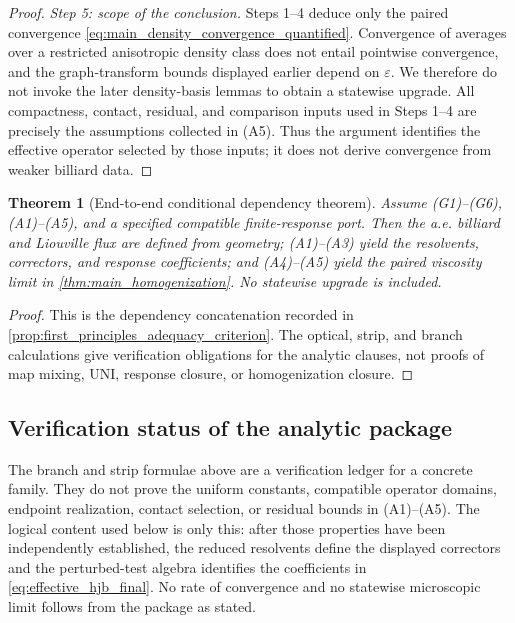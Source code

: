 \documentclass[12pt, letterpaper]{amsart}
\theoremstyle{plain}
\newtheorem{theorem}{Theorem}[section]
\theoremstyle{definition}
\theoremstyle{remark}
\begin{document}
\begin{proof}
\emph{Step 5: scope of the conclusion.}
Steps 1--4 deduce only the paired convergence
\eqref{eq:main_density_convergence_quantified}.  Convergence of averages over a
restricted anisotropic density class does not entail pointwise convergence, and
the graph-transform bounds displayed earlier depend on $\varepsilon$.  We
therefore do not invoke the later density-basis lemmas to obtain a statewise
upgrade.  All compactness, contact, residual, and comparison inputs used in
Steps 1--4 are precisely the assumptions collected in \textup{(A5)}.  Thus the
argument identifies the effective operator selected by those inputs; it does
not derive convergence from weaker billiard data.
\end{proof}




\begin{theorem}[End-to-end conditional dependency theorem]
\label{thm:end_to_end_deterministic_derivation}
Assume \textup{(G1)--(G6)}, \textup{(A1)--(A5)}, and a specified compatible
finite-response port. Then the a.e. billiard and Liouville flux are defined
from geometry; \textup{(A1)--(A3)} yield the resolvents, correctors, and
response coefficients; and \textup{(A4)--(A5)} yield the paired viscosity
limit in \cref{thm:main_homogenization}. No statewise upgrade is included.
\end{theorem}

\begin{proof}
This is the dependency concatenation recorded in
\cref{prop:first_principles_adequacy_criterion}. The optical, strip, and
branch calculations give verification obligations for the analytic clauses,
not proofs of map mixing, UNI, response closure, or homogenization closure.
\end{proof}

\subsection{Verification status of the analytic package}

The branch and strip formulae above are a verification ledger for a concrete
family.  They do not prove the uniform constants, compatible operator domains,
endpoint realization, contact selection, or residual bounds in
\textup{(A1)--(A5)}.  The logical content used below is only this: after those
properties have been independently established, the reduced resolvents define
the displayed correctors and the perturbed-test algebra identifies the
coefficients in \eqref{eq:effective_hjb_final}.  No rate of convergence and no
statewise microscopic limit follows from the package as stated.
\end{document}
